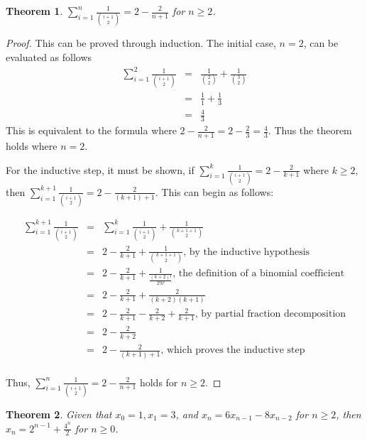\documentclass{article}
\newtheorem{theorem}{Theorem}
\begin{document}
\begin{theorem}
  $\displaystyle\sum_{i=1}^{n} \frac{1}{\binom{i+1}{2}} = 2- \frac{2}{n+1}$ for $ n \geq 2$.
  
  
\end{theorem}

\begin{proof}
    This can be proved through induction. The initial case, $n=2$, can be evaluated as follows
    \begin{eqnarray*}
    \sum_{i=1}^{2} \frac{1}{\binom{i+1}{2}} &=& \frac{1}{\binom{2}{2}} + \frac{1}{\binom{3}{2}}\\
    &=& \frac{1}{1} + \frac{1}{3}\\
    &=&\frac{4}{3}
    \end{eqnarray*}
    This is equivalent to the formula where $2- \frac{2}{n+1} = 2- \frac{2}{3}=\frac{4}{3}$. Thus the theorem holds where $n=2$.
    
    For the inductive step, it must be shown, if $\sum_{i=1}^{k} \frac{1}{\binom{i+1}{2}} = 2- \frac{2}{k+1}$ where $ k \geq 2$, then $\sum_{i=1}^{k+1} \frac{1}{\binom{i+1}{2}} = 2- \frac{2}{(k+1)+1}$. This can begin as follows:
    
    \begin{eqnarray*}
        \sum_{i=1}^{k+1} \frac{1}{\binom{i+1}{2}} &=& \sum_{i=1}^{k} \frac{1}{\binom{i+1}{2}} + \frac{1}{\binom{k+1+1}{2}}\\
        &=& 2-\frac{2}{k+1} + \frac{1}{\binom{k+1+1}{2}}\text{, by the inductive hypothesis}\\
        &=& 2-\frac{2}{k+1} + \frac{1}{\frac{(k+2)!}{2! k!}}\text{, the definition of a binomial coefficient}\\
        &=& 2-\frac{2}{k+1} + \frac{2}{(k+2)(k+1)}\\
        &=& 2-\frac{2}{k+1} - \frac{2}{k+2} + \frac{2}{k+1}\text{, by partial fraction decomposition}\\
        &=& 2-\frac{2}{k+2}\\
        &=& 2-\frac{2}{(k+1) +1 }\text{, which proves the inductive step}\\
    \end{eqnarray*}
    
    Thus, $\sum_{i=1}^{n} \frac{1}{\binom{i+1}{2}} = 2- \frac{2}{n+1}$ holds for $ n \geq 2$.
\end{proof}

\pagebreak
\begin{theorem}
    Given that $x_0=1,x_1=3$, and $ x_n=6x_{n-1}-8x_{n-2}$ for $n\geq 2$, then $x_n=2^{n-1}+\frac{4^n}{2}$ for $n\geq 0$.
\end{theorem}
\end{document}
